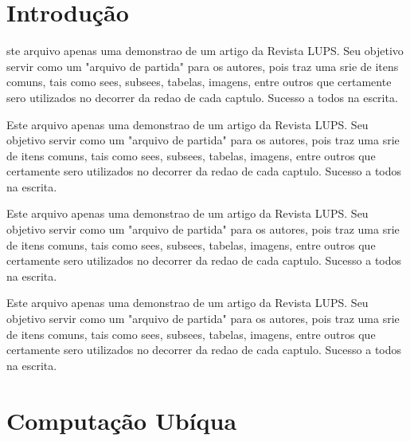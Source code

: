 \documentclass[12pt,a4paper,compsoc]{IEEEtran}
\begin{document}
\maketitle



\section{Introdução}


ste arquivo  apenas uma demonstrao de um artigo da Revista LUPS. Seu objetivo  servir como um "arquivo de partida" para os autores, pois traz uma srie de itens comuns, tais como sees, subsees, tabelas, imagens, entre outros que certamente sero utilizados no decorrer da redao de cada captulo. Sucesso a todos na escrita.


Este arquivo  apenas uma demonstrao de um artigo da Revista LUPS. Seu objetivo  servir como um "arquivo de partida" para os autores, pois traz uma srie de itens comuns, tais como sees, subsees, tabelas, imagens, entre outros que certamente sero utilizados no decorrer da redao de cada captulo. Sucesso a todos na escrita.


Este arquivo  apenas uma demonstrao de um artigo da Revista LUPS. Seu objetivo  servir como um "arquivo de partida" para os autores, pois traz uma srie de itens comuns, tais como sees, subsees, tabelas, imagens, entre outros que certamente sero utilizados no decorrer da redao de cada captulo. Sucesso a todos na escrita.


Este arquivo  apenas uma demonstrao de um artigo da Revista LUPS. Seu objetivo  servir como um "arquivo de partida" para os autores, pois traz uma srie de itens comuns, tais como sees, subsees, tabelas, imagens, entre outros que certamente sero utilizados no decorrer da redao de cada captulo. Sucesso a todos na escrita.



\section{Computação Ubíqua}


\end{document}
